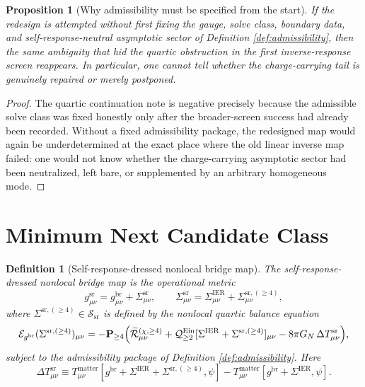 \documentclass[11pt]{article}
\newcommand{\ReBridge}{g^{\mathrm{br}}}
\newcommand{\OpMetricSR}{g^{\mathrm{sr}}}
\newcommand{\SigmaIER}{\Sigma^{\mathrm{IER}}}
\newcommand{\SigmaSR}{\Sigma^{\mathrm{sr}}}
\newcommand{\SigmaSRFour}{\Sigma^{\mathrm{sr},(\ge 4)}}
\newcommand{\ReLongFour}{\widetilde{\mathcal R}_{\mu\nu}^{(\chi,\ge 4)}}
\newcommand{\EinLin}{\mathcal E_{\ReBridge}}
\newcommand{\EinQuad}{\mathcal Q_{\ge 2}^{\mathrm{Ein}}}
\newcommand{\Pfour}{\mathbf P_{\ge 4}}
\newcommand{\SolveClass}{\mathscr S_{\mathrm{sr}}}
\newcommand{\DeltaTSR}{\Delta T_{\mu\nu}^{\mathrm{sr}}}
\newtheorem{definition}{Definition}
\newtheorem{proposition}{Proposition}
\begin{document}
\begin{proposition}[Why admissibility must be specified from the start]
\label{prop:whyadmissible}
If the redesign is attempted without first fixing the gauge, solve class, boundary data, and self-response-neutral asymptotic sector of Definition \ref{def:admissibility}, then the same ambiguity that hid the quartic obstruction in the first inverse-response screen reappears. In particular, one cannot tell whether the charge-carrying tail is genuinely repaired or merely postponed.
\end{proposition}

\begin{proof}
The quartic continuation note is negative precisely because the admissible solve class was fixed honestly only after the broader-screen success had already been recorded. Without a fixed admissibility package, the redesigned map would again be underdetermined at the exact place where the old linear inverse map failed: one would not know whether the charge-carrying asymptotic sector had been neutralized, left bare, or supplemented by an arbitrary homogeneous mode.
\end{proof}

\section{Minimum Next Candidate Class}

\begin{definition}[Self-response-dressed nonlocal bridge map]
\label{def:bridge}
The \emph{self-response-dressed nonlocal bridge map} is the operational metric
\begin{equation}
\OpMetricSR_{\mu\nu}
=
\ReBridge_{\mu\nu}
+\SigmaSR_{\mu\nu},
\qquad
\SigmaSR_{\mu\nu}
=
\SigmaIER_{\mu\nu}
+\SigmaSRFour_{\mu\nu},
\label{eq:gsr}
\end{equation}
where \(\SigmaSRFour\in\SolveClass\) is defined by the nonlocal quartic balance equation
\begin{equation}
\EinLin(\SigmaSRFour)_{\mu\nu}
=
-\Pfour
\Bigl(
\ReLongFour
+\EinQuad[\SigmaIER+\SigmaSRFour]_{\mu\nu}
-8\pi G_N\,\DeltaTSR
\Bigr),
\label{eq:balance}
\end{equation}
subject to the admissibility package of Definition \ref{def:admissibility}. Here
\begin{equation}
\DeltaTSR
\equiv
T_{\mu\nu}^{\mathrm{matter}}[\ReBridge+\SigmaIER+\SigmaSRFour,\psi]
-T_{\mu\nu}^{\mathrm{matter}}[\ReBridge+\SigmaIER,\psi].
\label{eq:deltat}
\end{equation}
\end{definition}
\end{document}
